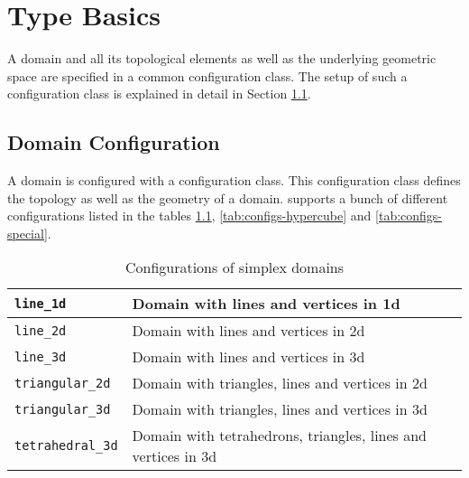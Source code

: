 \chapter{Type Basics} \label{chap:typebasics}

A domain and all its topological elements as well as the underlying geometric space are specified in a common configuration class.
The setup of such a configuration class is explained in detail in Section \ref{sec:domain-configuration}.

\section{Domain Configuration} \label{sec:domain-configuration}

A domain is configured with a configuration class. This configuration class defines the topology as well as the geometry of a domain. {\ViennaGrid} supports a bunch of different configurations listed in the tables \ref{tab:configs-simplex}, \ref{tab:configs-hypercube} and \ref{tab:configs-special}.


\begin{table}[tb]
  \begin{center}
    \begin{tabular}{|l|l|}
      \hline
      \lstinline|line_1d|   &  Domain with lines and vertices in 1d  \\
      \hline
      \lstinline|line_2d|   &  Domain with lines and vertices in 2d  \\
      \hline
      \lstinline|line_3d|   &  Domain with lines and vertices in 3d  \\
      \hline 
      \lstinline|triangular_2d| &   Domain with triangles, lines and vertices in 2d  \\
      \hline
      \lstinline|triangular_3d| &   Domain with triangles, lines and vertices in 3d  \\
      \hline
      \lstinline|tetrahedral_3d| &   Domain with tetrahedrons, triangles, lines and vertices in 3d  \\
      \hline
    \end{tabular}
    \caption{Configurations of simplex domains}
    \label{tab:configs-simplex}
  \end{center}
\end{table}


